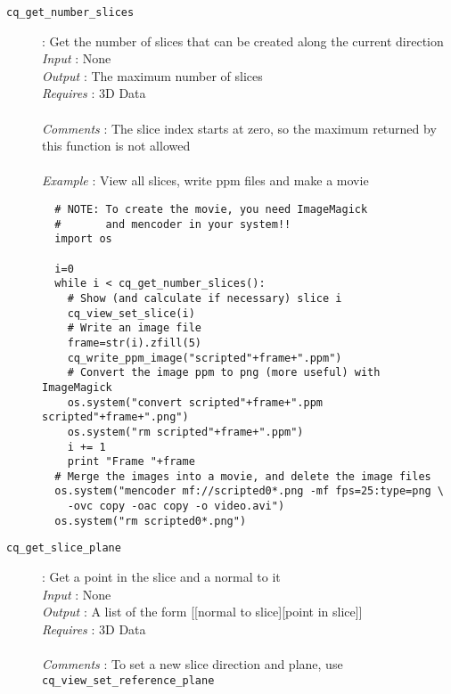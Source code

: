 \documentclass[a4paper,notitlepage,11pt]{article}
\begin{document}
\begin{description}
\item[\texttt{cq\_get\_number\_slices}]: Get the number of slices that can be created along the current direction\\
  \emph{Input} : None\\
  \emph{Output} : The maximum number of slices\\
  \emph{Requires} : 3D Data\\
  \\
  \emph{Comments} : The slice index starts at zero, so the maximum returned by this function is not allowed\\
  \\
  \emph{Example} : View all slices, write ppm files and make a movie
  \begin{verbatim}
  # NOTE: To create the movie, you need ImageMagick
  #       and mencoder in your system!!
  import os
  
  i=0
  while i < cq_get_number_slices():
    # Show (and calculate if necessary) slice i
    cq_view_set_slice(i)
    # Write an image file
    frame=str(i).zfill(5)
    cq_write_ppm_image("scripted"+frame+".ppm")
    # Convert the image ppm to png (more useful) with ImageMagick
    os.system("convert scripted"+frame+".ppm scripted"+frame+".png")
    os.system("rm scripted"+frame+".ppm")
    i += 1
    print "Frame "+frame
  # Merge the images into a movie, and delete the image files
  os.system("mencoder mf://scripted0*.png -mf fps=25:type=png \
    -ovc copy -oac copy -o video.avi")
  os.system("rm scripted0*.png")

  \end{verbatim}
\end{description}

\begin{description}
\item[\texttt{cq\_get\_slice\_plane}]: Get a point in the slice and a normal to it\\
  \emph{Input} : None\\
  \emph{Output} : A list of the form [[normal to slice][point in slice]]\\
  \emph{Requires} : 3D Data\\
  \\
  \emph{Comments} : To set a new slice direction and plane, use \texttt{cq\_view\_set\_reference\_plane}
\end{description}
\end{document}
